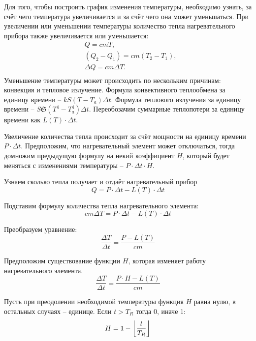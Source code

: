 \documentclass[a4paper, 14pt, titlepage, fleqn]{extarticle}
\DeclarePairedDelimiter\floor{\lfloor}{\rfloor}
\begin{document}
            Для того, чтобы построить график изменения температуры, необходимо узнать, за счёт чего температура увеличивается и за счёт чего она может уменьшаться.
            При увеличении или уменьшении температуры количество тепла нагревательного прибора также увеличивается или уменьшается:
            \[\begin{split}
                & Q = c m T, \\
                & \left( Q_2 - Q_1 \right) = c m \left( T_2 - T_1 \right), \\
                & \Delta Q = c m \Delta T. \\
            \end{split}\]
            Уменьшение температуры может происходить по нескольким причинам: конвекция и тепловое излучение. 
            Формула конвективного теплообмена за единицу времени -- \( k S \left( T - T_a \right) \Delta t \).
            Формула теплового излучения за единицу времени -- \( S \mathfrak{S} \left( T^4 - T_a^4 \right) \Delta t \).
            Переобозачим суммарные теплопотери за единицу времени как $L\left( T \right) \cdot \Delta t$.
            
            Увеличение количества тепла происходит за счёт мощности на единицу времени \(P \cdot \Delta t\).
            Предположим, что нагревательный элемент может отключаться, тогда домножим предыдущую формулу на некий коэффициент $H$, который будет меняться с изменениями температуры -- \( P \cdot \Delta t \cdot H \).
            
        
            Узнаем сколько тепла получает и отдаёт нагревательный прибор
            \[ Q = P \cdot \Delta t - L\left( T \right) \cdot \Delta t \]

            Подставим формулу количества тепла нагревательного элемента:
            \[c m \Delta T = P \cdot \Delta t - L\left( T \right) \cdot \Delta t \]

            Преобразуем уравнение:
            \[ \dfrac{\Delta T}{\Delta t} = \dfrac{P - L\left( T \right)}{c m} \]

            Предположим существование функции \(H\), которая изменяет работу нагревательного элемента.
            \[ \dfrac{\Delta T}{\Delta t} = \dfrac{P \cdot H - L\left( T \right)}{c m} \]

            Пусть при преодолении необходимой температуры функция $H$ равна нулю, в остальных случаях -- единице.
            Если $t > T_R$ тогда 0, иначе 1:
            \[ H = 1 - \floor*{\dfrac{t}{T_R}} \]
\end{document}
